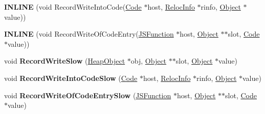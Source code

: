 \begin{DoxyCompactItemize}
\item 
{\bfseries I\+N\+L\+I\+NE} (void Record\+Write\+Into\+Code(\hyperlink{classv8_1_1internal_1_1_code}{Code} $\ast$host, \hyperlink{classv8_1_1internal_1_1_reloc_info}{Reloc\+Info} $\ast$rinfo, \hyperlink{classv8_1_1internal_1_1_object}{Object} $\ast$value))\hypertarget{classv8_1_1internal_1_1_incremental_marking_a9c1a025eba84470430cec394131733ba}{}\label{classv8_1_1internal_1_1_incremental_marking_a9c1a025eba84470430cec394131733ba}

\item 
{\bfseries I\+N\+L\+I\+NE} (void Record\+Write\+Of\+Code\+Entry(\hyperlink{classv8_1_1internal_1_1_j_s_function}{J\+S\+Function} $\ast$host, \hyperlink{classv8_1_1internal_1_1_object}{Object} $\ast$$\ast$slot,                                                                                                                                           \hyperlink{classv8_1_1internal_1_1_code}{Code} $\ast$value))\hypertarget{classv8_1_1internal_1_1_incremental_marking_af30e6fe1b56639592d79f3694dd680a3}{}\label{classv8_1_1internal_1_1_incremental_marking_af30e6fe1b56639592d79f3694dd680a3}

\item 
void {\bfseries Record\+Write\+Slow} (\hyperlink{classv8_1_1internal_1_1_heap_object}{Heap\+Object} $\ast$obj, \hyperlink{classv8_1_1internal_1_1_object}{Object} $\ast$$\ast$slot, \hyperlink{classv8_1_1internal_1_1_object}{Object} $\ast$value)\hypertarget{classv8_1_1internal_1_1_incremental_marking_a00e0a474715342e0edb32567f95b8648}{}\label{classv8_1_1internal_1_1_incremental_marking_a00e0a474715342e0edb32567f95b8648}

\item 
void {\bfseries Record\+Write\+Into\+Code\+Slow} (\hyperlink{classv8_1_1internal_1_1_code}{Code} $\ast$host, \hyperlink{classv8_1_1internal_1_1_reloc_info}{Reloc\+Info} $\ast$rinfo, \hyperlink{classv8_1_1internal_1_1_object}{Object} $\ast$value)\hypertarget{classv8_1_1internal_1_1_incremental_marking_ab5f9756ba2134ae183eedc412b40d71a}{}\label{classv8_1_1internal_1_1_incremental_marking_ab5f9756ba2134ae183eedc412b40d71a}

\item 
void {\bfseries Record\+Write\+Of\+Code\+Entry\+Slow} (\hyperlink{classv8_1_1internal_1_1_j_s_function}{J\+S\+Function} $\ast$host, \hyperlink{classv8_1_1internal_1_1_object}{Object} $\ast$$\ast$slot, \hyperlink{classv8_1_1internal_1_1_code}{Code} $\ast$value)\hypertarget{classv8_1_1internal_1_1_incremental_marking_a37adba0ba7f17252dc7e9e0356a31b39}{}\label{classv8_1_1internal_1_1_incremental_marking_a37adba0ba7f17252dc7e9e0356a31b39}


\end{DoxyCompactItemize}

